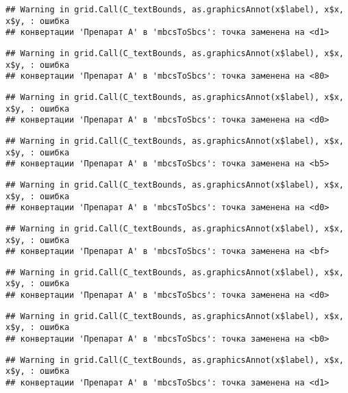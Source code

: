 \documentclass[
]{article}
\begin{document}
\begin{verbatim}
## Warning in grid.Call(C_textBounds, as.graphicsAnnot(x$label), x$x, x$y, : ошибка
## конвертации 'Препарат A' в 'mbcsToSbcs': точка заменена на <d1>
\end{verbatim}

\begin{verbatim}
## Warning in grid.Call(C_textBounds, as.graphicsAnnot(x$label), x$x, x$y, : ошибка
## конвертации 'Препарат A' в 'mbcsToSbcs': точка заменена на <80>
\end{verbatim}

\begin{verbatim}
## Warning in grid.Call(C_textBounds, as.graphicsAnnot(x$label), x$x, x$y, : ошибка
## конвертации 'Препарат A' в 'mbcsToSbcs': точка заменена на <d0>
\end{verbatim}

\begin{verbatim}
## Warning in grid.Call(C_textBounds, as.graphicsAnnot(x$label), x$x, x$y, : ошибка
## конвертации 'Препарат A' в 'mbcsToSbcs': точка заменена на <b5>
\end{verbatim}

\begin{verbatim}
## Warning in grid.Call(C_textBounds, as.graphicsAnnot(x$label), x$x, x$y, : ошибка
## конвертации 'Препарат A' в 'mbcsToSbcs': точка заменена на <d0>
\end{verbatim}

\begin{verbatim}
## Warning in grid.Call(C_textBounds, as.graphicsAnnot(x$label), x$x, x$y, : ошибка
## конвертации 'Препарат A' в 'mbcsToSbcs': точка заменена на <bf>
\end{verbatim}

\begin{verbatim}
## Warning in grid.Call(C_textBounds, as.graphicsAnnot(x$label), x$x, x$y, : ошибка
## конвертации 'Препарат A' в 'mbcsToSbcs': точка заменена на <d0>
\end{verbatim}

\begin{verbatim}
## Warning in grid.Call(C_textBounds, as.graphicsAnnot(x$label), x$x, x$y, : ошибка
## конвертации 'Препарат A' в 'mbcsToSbcs': точка заменена на <b0>
\end{verbatim}

\begin{verbatim}
## Warning in grid.Call(C_textBounds, as.graphicsAnnot(x$label), x$x, x$y, : ошибка
## конвертации 'Препарат A' в 'mbcsToSbcs': точка заменена на <d1>
\end{verbatim}
\end{document}

